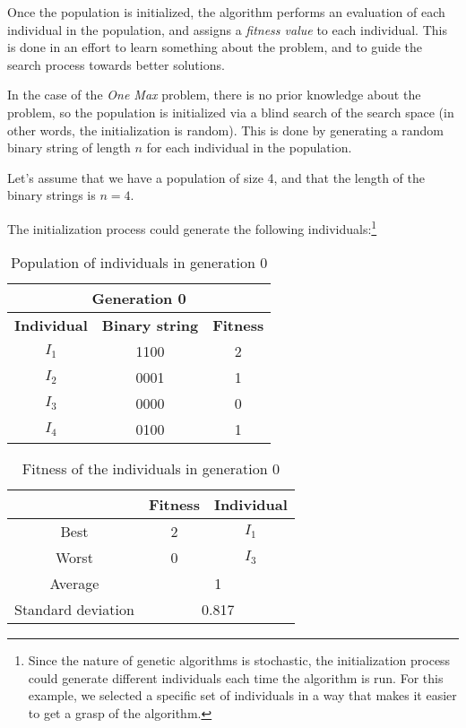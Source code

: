   Once the population is initialized, the algorithm performs an evaluation of 
  each individual in the population, and assigns a \emph{fitness value} to each 
  individual.
  This is done in an effort to learn something about the problem, and to guide 
  the search process towards better solutions.

  In the case of the \emph{One Max} problem, there is no prior knowledge about 
  the problem, so the population is initialized via a blind search of the 
  search space (in other words, the initialization is random).
  This is done by generating a random binary string of length \(n\) for each 
  individual in the population.

  Let's assume that we have a population of size 4, and that the length of the 
  binary strings is \(n = 4\).


  The initialization process could generate the following individuals:\footnote{
    Since the nature of genetic algorithms is stochastic, the initialization 
    process could generate different individuals each time the algorithm is run.
    For this example, we selected a specific set of individuals in a way that 
    makes it easier to get a grasp of the algorithm.
  }

  \begin{table}[H]
    \label{tab:genetic_algorithms:initialization:population}
    \centering
    \begin{tabular}{c|c|c}
      \multicolumn{3}{c}{\textbf{Generation 0}} \\
      \hline
      \hline
      \textbf{Individual} & \textbf{Binary string} & \textbf{Fitness} \\
      \hline
      \(I_1\) & 1100 & 2 \\
      \(I_2\) & 0001 & 1 \\
      \(I_3\) & 0000 & 0 \\
      \(I_4\) & 0100 & 1 \\
    \end{tabular}
    \caption{Population of individuals in generation 0}
  \end{table}

  \begin{table}[H]
    \centering
    \begin{tabular}{|c|c|c|}
      \hline
      & \textbf{Fitness} & \textbf{Individual}  \\
      \hline
      Best & 2 & \(I_1\) \\
      Worst & 0 & \(I_3\) \\
      \hline
      \hline
      Average & \multicolumn{2}{c|}{1} \\
      \hline
      Standard deviation & \multicolumn{2}{c|}{0.817} \\
      \hline
    \end{tabular}
    \caption{Fitness of the individuals in generation 0}
    \label{tab:genetic_algorithms:initialization:population_fitness}
  \end{table}
  
